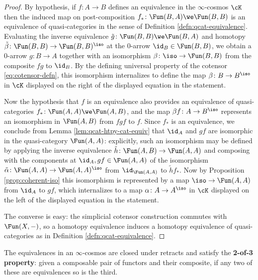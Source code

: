 \begin{proof}
By hypothesis, if $f \colon A \to B$ defines an equivalence in the $\infty$-cosmos $\cK$ then the induced map on post-composition $f_* \colon \Fun(B,A) \we \Fun(B,B)$ is an equivalence of quasi-categories in the sense of Definition \ref{defn:qcat-equivalence}. Evaluating the inverse equivalence $\tilde{g} \colon \Fun(B,B) \we \Fun(B,A)$ and homotopy $\tilde{\beta} \colon \Fun(B,B) \to \Fun(B,B)^\iso$ at the 0-arrow $\id_B \in \Fun(B,B)$, we obtain a 0-arrow $g \colon B \to A$ together with an isomorphism $\beta \colon \iso\to\Fun(B,B)$ from the composite $fg$ to $\id_B$. By the defining universal property of the cotensor \eqref{eq:cotensor-defn}, this isomorphism internalizes to define the map $\beta \colon B \to B^\iso$ in $\cK$ displayed on the right of the displayed equation in the statement.

Now the hypothesis that $f$ is an equivalence also provides an equivalence of quasi-categories $f_* \colon \Fun(A,A) \we \Fun(A,B)$, and the map $\beta f \colon A \to B^\iso$ represents an isomorphism in $\Fun(A,B)$ from $fgf$ to $f$. Since $f_*$ is an equivalence, we conclude from Lemma \ref{lem:qcat-htpy-cat-equiv} that $\id_A$ and $gf$ are isomorphic in the quasi-category $\Fun(A,A)$: explicitly, such an isomorphism may be defined by applying the inverse equivalence $\tilde{h} \colon \Fun(A,B) \to \Fun(A,A)$ and composing with the components at $\id_A, gf \in \Fun(A,A)$ of the isomorphism $\tilde{\alpha} \colon \Fun(A,A) \to \Fun(A,A)^\iso$ from $\id_{\Fun(A,A)}$ to $\tilde{h}f_*$. Now by Proposition \ref{prop:coherent-iso} this isomorphism is represented by a map $\iso \to \Fun(A,A)$ from $\id_A$ to $gf$, which internalizes to a map $\alpha \colon A \to A^\iso$ in $\cK$ displayed on the left of the displayed equation in the statement.

The converse is easy: the simplicial cotensor construction commutes with $\Fun(X,-)$, so a homotopy equivalence induces a  homotopy equivalence of quasi-categories as in Definition \ref{defn:qcat-equivalence}.
\end{proof}


  \begin{lemma}\label{lem:equivalence-2-of-3} The equivalences in an $\infty$-cosmos are closed under retracts and satisfy the \textbf{2-of-3 property}: given a composable pair of functors and their composite, if any two of these are equivalences so is the third.
\end{lemma}



